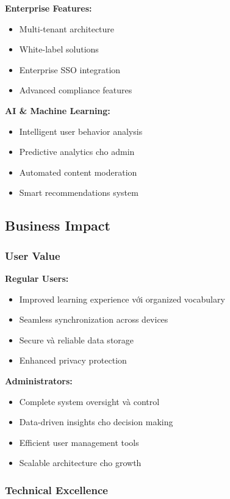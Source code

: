 \documentclass[12pt,a4paper]{article}
\begin{document}
\textbf{Enterprise Features:}
\begin{itemize}
    \item Multi-tenant architecture
    \item White-label solutions
    \item Enterprise SSO integration
    \item Advanced compliance features
\end{itemize}

\textbf{AI \& Machine Learning:}
\begin{itemize}
    \item Intelligent user behavior analysis
    \item Predictive analytics cho admin
    \item Automated content moderation
    \item Smart recommendations system
\end{itemize}

\subsection{Business Impact}

\subsubsection{User Value}

\textbf{Regular Users:}
\begin{itemize}
    \item Improved learning experience với organized vocabulary
    \item Seamless synchronization across devices
    \item Secure và reliable data storage
    \item Enhanced privacy protection
\end{itemize}

\textbf{Administrators:}
\begin{itemize}
    \item Complete system oversight và control
    \item Data-driven insights cho decision making
    \item Efficient user management tools
    \item Scalable architecture cho growth
\end{itemize}

\subsubsection{Technical Excellence}
\end{document}
